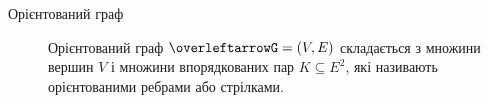 \begin{description}
  \item[Орієнтований граф] Орієнтований граф $\overleftarrowG=(V,E)$ складається з множини вершин $V$ і множини впорядкованих пар $K \subseteq E^2$, які називають орієнтованими ребрами або стрілками.
\end{description}

